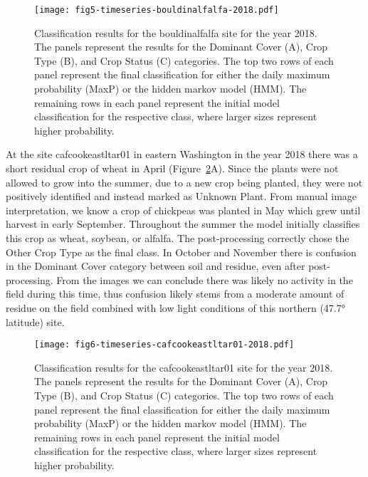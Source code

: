 \documentclass[remotesensing,article,submit,moreauthors,pdftex]{Definitions/mdpi}
\begin{document}
\begin{figure}[H]
    \centering
    \texttt{[image: fig5-timeseries-bouldinalfalfa-2018.pdf]}
    \caption{Classification results for the bouldinalfalfa site for the year 2018. The panels represent the results for the Dominant Cover (A), Crop Type (B), and Crop Status (C) categories. The top two rows of each panel represent the final classification for either the daily maximum probability (MaxP) or the hidden markov model (HMM). The remaining rows in each panel represent the initial model classification for the respective class, where larger sizes represent higher probability.}
    \label{fig5}
\end{figure}

At the site cafcookeastltar01 in eastern Washington in the year 2018 there was a short residual crop of wheat in April (Figure~\ref{fig6}A). Since the plants were not allowed to grow into the summer, due to a new crop being planted, they were not positively identified and instead marked as Unknown Plant. From manual image interpretation, we know a crop of chickpeas was planted in May which grew until harvest in early September. Throughout the summer the model initially classifies this crop as wheat, soybean, or alfalfa. The post-processing correctly chose the Other Crop Type as the final class. In October and November there is confusion in the Dominant Cover category between soil and residue, even after post-processing. From the images we can conclude there was likely no activity in the field during this time, thus confusion likely stems from a moderate amount of residue on the field combined with low light conditions of this northern (47.7° latitude) site. 

\begin{figure}[H]
    \centering
    \texttt{[image: fig6-timeseries-cafcookeastltar01-2018.pdf]}
    \caption{Classification results for the cafcookeastltar01 site for the year 2018. The panels represent the results for the Dominant Cover (A), Crop Type (B), and Crop Status (C) categories. The top two rows of each panel represent the final classification for either the daily maximum probability (MaxP) or the hidden markov model (HMM). The remaining rows in each panel represent the initial model classification for the respective class, where larger sizes represent higher probability. }
    \label{fig6}
\end{figure}
\end{document}
